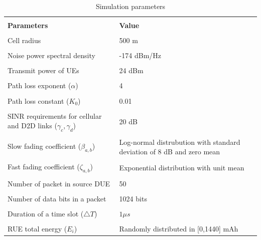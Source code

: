 \documentclass[conference]{IEEEtran}
\begin{document}
\begin{table}[!t]
  \centering
  \scriptsize
  \caption{Simulation parameters}
  \label{tab:notations}
  \begin{tabular}{m{3cm}m{3cm}}
    \\[-2mm]
    \hline\\[-2mm]
    {\bf  Parameters}& {\bf Value}\\
    \hline
    \hline
    \vspace{1mm}\\[-3mm]
    Cell radius      &    500 m\\
    \hline
    \vspace{1mm}\\[-3mm]
    Noise power spectral density &    -174 dBm/Hz \\
    \hline
    \vspace{1mm}\\[-3mm]
    Transmit power of UEs &  24 dBm\\
    \hline
    \vspace{1mm}\\[-3mm]
    Path loss exponent ($\alpha$) &  4 \\
    \hline
    \vspace{1mm}\\[-3mm]
    Path loss constant ($K_0$) &   0.01\\
    \hline
    \vspace{1mm}\\[-3mm]
    SINR requirements for cellular and D2D links ($\gamma_c,\gamma_d$) &  20 dB \\
    \hline
    \vspace{1mm}\\[-3mm]
    Slow fading coefficient ($\beta_{a,b}$) &  Log-normal distrubution with standard deviation of 8 dB and zero mean\\
    \hline
    \vspace{1mm}\\[-3mm]
    Fast fading coefficient ($\zeta_{a,b}$) &  Exponential distribution with unit mean\\
    \hline
    \vspace{1mm}\\[-3mm]
    Number of packet in source DUE &  50 \\
    \hline
    \vspace{1mm}\\[-3mm]
    Number of data bits in a packet &  1024 bits\\
    \hline
    \vspace{1mm}\\[-3mm]
    Duration of a time slot ($\triangle T$) &  $1 \mu s$\\
    \hline
    \vspace{1mm}\\[-3mm]
    RUE total energy ($E_i$) &  Randomly distributed in [0,1440] mAh \\
    \hline
  \end{tabular}
\end{table}
\end{document}
